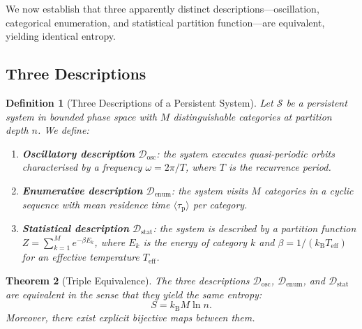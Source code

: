 \documentclass[11pt,twocolumn,a4paper]{article}
\newtheorem{theorem}{Theorem}[section]
\newtheorem{definition}[theorem]{Definition}
\newcommand{\kb}{k_{\mathrm{B}}}
\newcommand{\taup}{\tau_{\mathrm{p}}}
\begin{document}
We now establish that three apparently distinct descriptions---oscillation, categorical enumeration, and statistical partition function---are equivalent, yielding identical entropy.

\subsection{Three Descriptions}

\begin{definition}[Three Descriptions of a Persistent System]\label{def:three_descriptions}
Let $\mathcal{S}$ be a persistent system in bounded phase space with $M$ distinguishable categories at partition depth $n$. We define:
\begin{enumerate}[label=(\roman*)]
    \item \textbf{Oscillatory description} $\mathcal{D}_{\text{osc}}$: the system executes quasi-periodic orbits characterised by a frequency $\omega = 2\pi / T$, where $T$ is the recurrence period.
    \item \textbf{Enumerative description} $\mathcal{D}_{\text{enum}}$: the system visits $M$ categories in a cyclic sequence with mean residence time $\langle \taup \rangle$ per category.
    \item \textbf{Statistical description} $\mathcal{D}_{\text{stat}}$: the system is described by a partition function $Z = \sum_{k=1}^{M} e^{-\beta E_k}$, where $E_k$ is the energy of category $k$ and $\beta = 1/(\kb T_{\text{eff}})$ for an effective temperature $T_{\text{eff}}$.
\end{enumerate}
\end{definition}

\begin{theorem}[Triple Equivalence]\label{thm:triple_equivalence}
The three descriptions $\mathcal{D}_{\text{osc}}$, $\mathcal{D}_{\text{enum}}$, and $\mathcal{D}_{\text{stat}}$ are equivalent in the sense that they yield the same entropy:
\begin{equation}
    S = \kb M \ln n.
    \label{eq:triple_entropy}
\end{equation}
Moreover, there exist explicit bijective maps between them.
\end{theorem}
\end{document}
